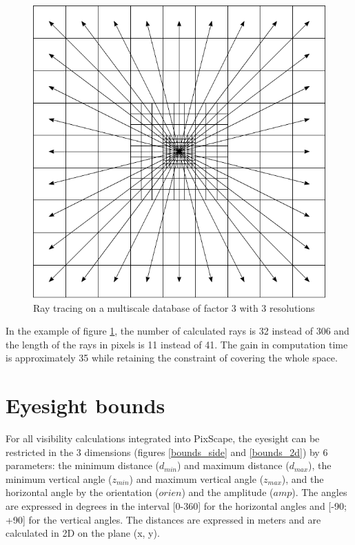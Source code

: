 \documentclass{report}
\begin{document}
\begin{figure}[H]
	\includegraphics{img/grid_multi.pdf} 
	\caption{Ray tracing on a multiscale database of factor 3 with 3 resolutions}
	\label{grid_multi}
\end{figure}

In the example of figure \ref{grid_multi}, the number of calculated rays is 32 instead of 306 and the length of the rays in pixels is 11 instead of 41. The gain in computation time is approximately 35 while retaining the constraint of covering the whole space.


\section{Eyesight bounds}
\label{bounds}
For all visibility calculations integrated into PixScape, the eyesight can be restricted in the 3 dimensions (figures \ref{bounds_side} and \ref{bounds_2d}) by 6 parameters: the minimum distance ($d_{min}$) and maximum distance ($d_{max}$), the minimum vertical angle ($z_{min}$) and maximum vertical angle ($z_{max}$), and the horizontal angle by the orientation ($orien$) and the amplitude ($amp$). The angles are expressed in degrees in the interval [0-360] for the horizontal angles and [-90; +90] for the vertical angles. The distances are expressed in meters and are calculated in 2D on the plane (x, y).
\end{document}
